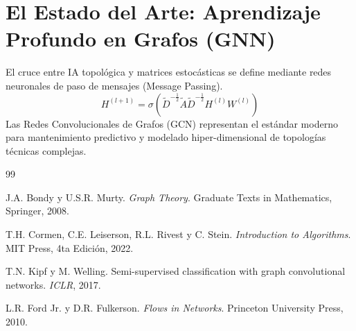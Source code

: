 \documentclass[11pt,letterpaper]{article}
\begin{document}
\section{El Estado del Arte: Aprendizaje Profundo en Grafos (GNN)}
El cruce entre IA topológica y matrices estocásticas se define mediante redes neuronales de paso de mensajes (Message Passing).
\begin{equation}
H^{(l+1)} = \sigma \left( \tilde{D}^{-\frac{1}{2}} \tilde{A} \tilde{D}^{-\frac{1}{2}} H^{(l)} W^{(l)} \right)
\end{equation}
Las Redes Convolucionales de Grafos (GCN) representan el estándar moderno para mantenimiento predictivo y modelado hiper-dimensional de topologías técnicas complejas.

\begin{thebibliography}{99}

J.A. Bondy y U.S.R. Murty.
\emph{Graph Theory}.
Graduate Texts in Mathematics, Springer, 2008.

T.H. Cormen, C.E. Leiserson, R.L. Rivest y C. Stein.
\emph{Introduction to Algorithms}.
MIT Press, 4ta Edición, 2022.

T.N. Kipf y M. Welling.
Semi-supervised classification with graph convolutional networks.
\emph{ICLR}, 2017.

L.R. Ford Jr. y D.R. Fulkerson.
\emph{Flows in Networks}.
Princeton University Press, 2010.

\end{thebibliography}
\end{document}
